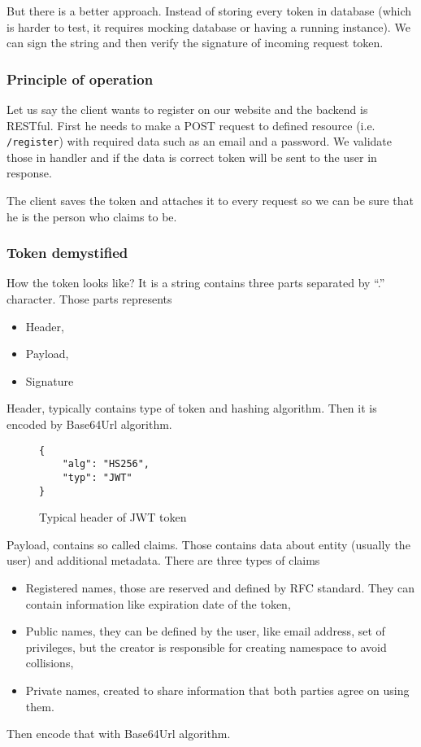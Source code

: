 But there is a better approach. Instead of storing every token in database (which is harder to test, it requires mocking database or having a running instance). We can sign the string and then verify the signature of incoming request token.

\subsubsection{Principle of operation}
Let us say the client wants to register on our website and the backend is RESTful. First he needs to make a POST request to defined resource (i.e. \verb|/register|) with required data such as an email and a password. We validate those in handler and if the data is correct token will be sent to the user in response.

The client saves the token and attaches it to every request so we can be sure that he is the person who claims to be.

\subsubsection{Token demystified}
How the token looks like? It is a string contains three parts separated by ``.'' character\cite{JWT-introduction}. Those parts represents
\begin{itemize}
\item Header,
\item Payload,
\item Signature
\end{itemize}

Header, typically contains type of token and hashing algorithm. Then it is encoded by Base64Url algorithm.
\begin{figure}[!htbp]
\begin{verbatim}
{
    "alg": "HS256",
    "typ": "JWT"
}
\end{verbatim}
\caption{Typical header of JWT token}
\label{src:typical-header}
\end{figure}

Payload, contains so called claims. Those contains data about entity (usually the user) and additional metadata. There are three types of claims
\begin{itemize}
\item Registered names, those are reserved and defined by RFC standard. They can contain information like expiration date of the token\cite{JWT-rfc},
\item Public names, they can be defined by the user, like email address, set of privileges, but the creator is responsible for creating namespace to avoid collisions,
\item Private names, created to share information that both parties agree on using them.
\end{itemize}
Then encode that with Base64Url algorithm.

